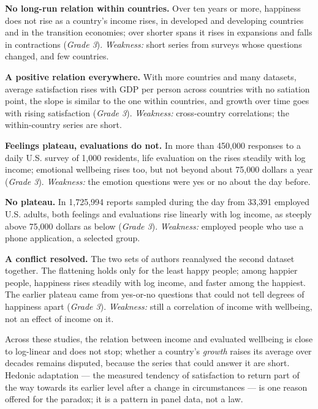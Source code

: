 \begin{debate}
\textbf{No long-run relation within countries.} Over ten years or more, happiness
does not rise as a country's income rises, in developed and developing countries and
in the transition economies; over shorter spans it rises in expansions and falls in
contractions (\emph{Grade 3}). %
\emph{Weakness:} short series from surveys whose questions changed, and few
countries.

\textbf{A positive relation everywhere.} With more countries and many datasets,
average satisfaction rises with GDP per person across countries with no satiation
point, the slope is similar to the one within countries, and growth over time goes
with rising satisfaction (\emph{Grade 3}). %
\emph{Weakness:} cross-country correlations; the within-country series are short.

\textbf{Feelings plateau, evaluations do not.} In more than 450{,}000 responses to a daily U.S. survey of 1{,}000
residents, life evaluation on the  rises steadily with log income;
emotional wellbeing rises too, but not beyond about 75{,}000 dollars a year (\emph{Grade 3}). %
\emph{Weakness:} the emotion questions were yes or no about the day before.

\textbf{No plateau.} In 1{,}725{,}994 reports sampled during the day from 33{,}391 employed U.S. adults, both
feelings and evaluations rise linearly with log income, as steeply above 75{,}000 dollars
as below (\emph{Grade 3}). %
\emph{Weakness:} employed people who use a phone application, a selected group.

\textbf{A conflict resolved.} The two sets of authors reanalysed the second dataset
together. The flattening holds only for the least happy people; among happier people,
happiness rises steadily with log income, and faster among the happiest. The earlier
plateau came from yes-or-no questions that could not tell degrees of happiness apart
(\emph{Grade 3}). %
\emph{Weakness:} still a correlation of income with wellbeing, not an effect of
income on it.
\end{debate}

Across these studies, the relation between income and evaluated wellbeing is
close to log-linear and does not stop; whether a country's \emph{growth} raises its
average over decades remains disputed, because the series that could answer it are
short. Hedonic adaptation --- the measured tendency of satisfaction to return part of
the way towards its earlier level after a change in circumstances --- is one reason
offered for the paradox; it is a pattern in panel data, not a law.

